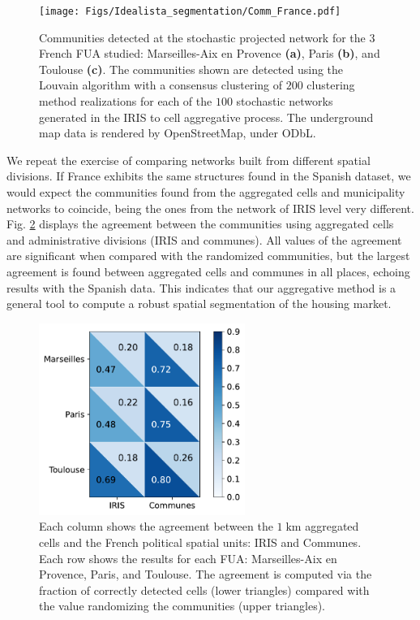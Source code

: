 \begin{figure}
    \label{fig:france_comm}
    \centering
    \texttt{[image: Figs/Idealista\_segmentation/Comm\_France.pdf]}
	\caption[Spatial segmentation for $1 \; \textrm{km}$ aggregated cells constructed from IRIS level data for France.]{ Communities detected at the stochastic projected network for the 3 French FUA studied: Marseilles-Aix en Provence \textbf{(a)}, Paris \textbf{(b)}, and Toulouse \textbf{(c)}. The communities shown are detected using the Louvain algorithm with a consensus clustering of $200$ clustering method realizations for each of the $100$ stochastic networks generated in the IRIS to cell aggregative process. The underground map data is rendered by OpenStreetMap, under ODbL.}
\end{figure}

We repeat the exercise of comparing networks built from different spatial divisions. If France exhibits the same structures found in the Spanish dataset, we would expect the communities found from the aggregated cells and municipality networks to coincide, being the ones from the network of IRIS level very different. Fig. \ref{fig:Compare_france} displays the agreement between the communities using aggregated cells and administrative divisions (IRIS and communes). All values of the agreement are significant when compared with the randomized communities, but the largest agreement is found between aggregated cells and communes in all places, echoing results with the Spanish data. This indicates that our aggregative method is a general tool to compute a robust spatial segmentation of the housing market.

\begin{figure}
    \label{fig:Compare_france}
    \centering
    \includegraphics[width = 0.6\textwidth]{Figs/Idealista_segmentation/Cells_agreement_different_topologies_France.pdf}
	\caption[Comparison between the $1 \; \textrm{km}$ aggregated cells communities and the political units communities in France.]{ Each column shows the agreement between the $1 \; \textrm{km}$ aggregated cells and the French political spatial units: IRIS and Communes. Each row shows the results for each FUA: Marseilles-Aix en Provence, Paris, and Toulouse. The agreement is computed via the fraction of correctly detected cells (lower triangles) compared with the value randomizing the communities (upper triangles).}
\end{figure}


